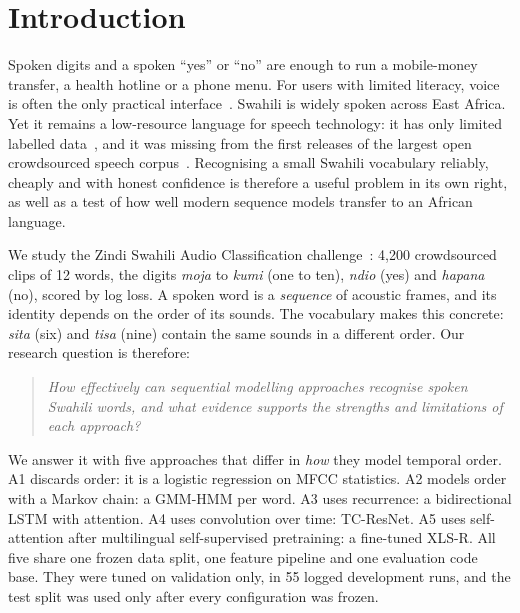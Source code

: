 \section{Introduction}
\label{sec:intro}

Spoken digits and a spoken ``yes'' or ``no'' are enough to run a mobile-money transfer, a health hotline or a
phone menu. For users with limited literacy, voice is often the only practical interface~\cite{doumbouya2021using}.
Swahili is widely spoken across East Africa. Yet it remains a low-resource language for speech technology: it has
only limited labelled data~\cite{joshi2020state}, and it was missing from the first releases of the largest open
crowdsourced speech corpus~\cite{ardila2020common}. Recognising a small Swahili vocabulary reliably, cheaply and
with honest confidence is therefore a useful problem in its own right, as well as a test of how well modern sequence
models transfer to an African language.

We study the Zindi Swahili Audio Classification challenge~\cite{zindi2021swahili}: 4{,}200 crowdsourced clips of
12 words, the digits \textit{moja} to \textit{kumi} (one to ten), \textit{ndio} (yes) and \textit{hapana} (no),
scored by log loss. A spoken word is a \emph{sequence} of acoustic frames, and its identity depends on the order of
its sounds. The vocabulary makes this concrete: \textit{sita} (six) and \textit{tisa} (nine) contain the same sounds
in a different order. Our research question is therefore:
\begin{quote}
  \emph{How effectively can sequential modelling approaches recognise spoken Swahili words, and what evidence
  supports the strengths and limitations of each approach?}
\end{quote}

We answer it with five approaches that differ in \emph{how} they model temporal order. A1 discards order: it is a
logistic regression on MFCC statistics. A2 models order with a Markov chain: a GMM-HMM per word. A3 uses
recurrence: a bidirectional LSTM with attention. A4 uses convolution over time: TC-ResNet. A5 uses self-attention
after multilingual self-supervised pretraining: a fine-tuned XLS-R. All five share one frozen data split, one feature
pipeline and one evaluation code base. They were tuned on validation only, in 55 logged development runs, and the
test split was used only after every configuration was frozen.

